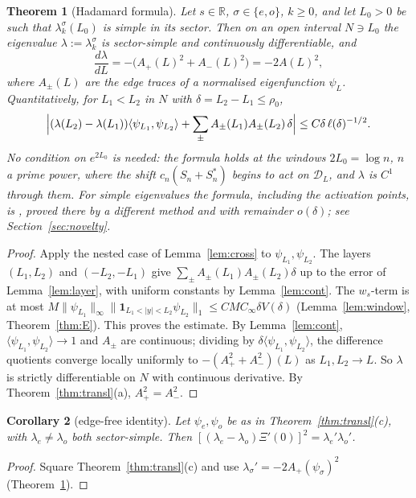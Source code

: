 \documentclass[11pt]{amsart}
\newcommand{\R}{\mathbb{R}}
\newcommand{\one}{\mathbf{1}}
\newtheorem{theorem}{Theorem}[section]
\newtheorem{corollary}[theorem]{Corollary}
\theoremstyle{definition}
\theoremstyle{remark}
\numberwithin{equation}{section}
\begin{document}
\begin{theorem}[Hadamard formula]\label{thm:H}
Let $s\in\R$, $\sigma\in\{e,o\}$, $k\ge0$, and let $L_0>0$ be such that $\lambda^\sigma_k(L_0)$ is simple in its sector. Then on an open interval $N\ni L_0$ the eigenvalue $\lambda:=\lambda^\sigma_k$ is sector-simple and continuously differentiable, and
\[
\frac{d\lambda}{dL}=-\bigl(A_+(L)^2+A_-(L)^2\bigr)=-2A(L)^2,
\]
where $A_\pm(L)$ are the edge traces of a normalised eigenfunction $\psi_L$. Quantitatively, for $L_1<L_2$ in $N$ with $\delta=L_2-L_1\le\rho_0$,
\[
\Bigl|(\lambda(L_2)-\lambda(L_1))\langle\psi_{L_1},\psi_{L_2}\rangle+\sum_\pm A_\pm(L_1)A_\pm(L_2)\,\delta\Bigr|\le C\delta\,\ell(\delta)^{-1/2}.
\]
No condition on $e^{2L_0}$ is needed: the formula holds at the windows $2L_0=\log n$, $n$ a prime power, where the shift $c_n(S_n+S_n^*)$ begins to act on $\mathcal D_L$, and $\lambda$ is $C^1$ through them. For simple eigenvalues the formula, including the activation points, is \cite[Thm.~2.2, (2.6)]{BT26}, proved there by a different method and with remainder $o(\delta)$; see Section~\ref{sec:novelty}.
\end{theorem}

\begin{proof}
Apply the nested case of Lemma~\ref{lem:cross} to $\psi_{L_1},\psi_{L_2}$. The layers $(L_1,L_2)$ and $(-L_2,-L_1)$ give $\sum_\pm A_\pm(L_1)A_\pm(L_2)\delta$ up to the error of Lemma~\ref{lem:layer}, with uniform constants by Lemma~\ref{lem:cont}. The $w_s$-term is at most $M\|\psi_{L_1}\|_\infty\|\one_{L_1<|y|<L_2}\psi_{L_2}\|_1\le CMC_\infty\delta V(\delta)$ (Lemma~\ref{lem:window}, Theorem~\ref{thm:E}). This proves the estimate. By Lemma~\ref{lem:cont}, $\langle\psi_{L_1},\psi_{L_2}\rangle\to1$ and $A_\pm$ are continuous; dividing by $\delta\langle\psi_{L_1},\psi_{L_2}\rangle$, the difference quotients converge locally uniformly to $-(A_+^2+A_-^2)(L)$ as $L_1,L_2\to L$. So $\lambda$ is strictly differentiable on $N$ with continuous derivative. By Theorem~\ref{thm:transl}(a), $A_+^2=A_-^2$.
\end{proof}

\begin{corollary}[edge-free identity]\label{cor:edgefree}
Let $\psi_e,\psi_o$ be as in Theorem~\ref{thm:transl}(c), with $\lambda_e\ne\lambda_o$ both sector-simple. Then $[(\lambda_e-\lambda_o)\Xi'(0)]^2=\lambda_e'\lambda_o'$.
\end{corollary}

\begin{proof}
Square Theorem~\ref{thm:transl}(c) and use $\lambda_\sigma'=-2A_+(\psi_\sigma)^2$ (Theorem~\ref{thm:H}).
\end{proof}
\end{document}
